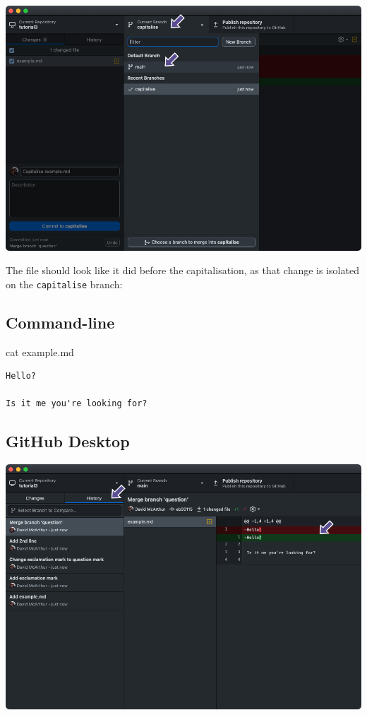 \documentclass[
  letterpaper,
  DIV=11,
  numbers=noendperiod]{scrartcl}
\newenvironment{Shaded}{\begin{snugshade}}{\end{snugshade}}
\newcommand{\FunctionTok}[1]{\textcolor[rgb]{0.28,0.35,0.67}{#1}}
\newcommand{\NormalTok}[1]{\textcolor[rgb]{0.00,0.23,0.31}{#1}}
\begin{document}
\includegraphics{images/image48.png}

The file should look like it did before the capitalisation, as that
change is isolated on the \texttt{capitalise} branch:

\subsection{Command-line}

\begin{Shaded}
\begin{Highlighting}[]
\FunctionTok{cat}\NormalTok{ example.md}
\end{Highlighting}
\end{Shaded}

\begin{verbatim}
Hello?

Is it me you're looking for?
\end{verbatim}

\subsection{GitHub Desktop}

\includegraphics{images/image49.png}
\end{document}
